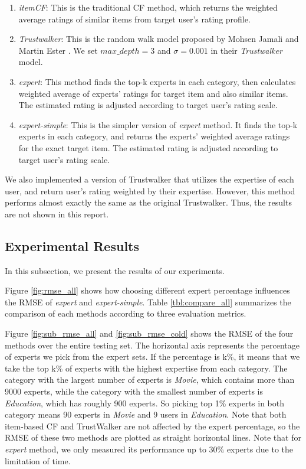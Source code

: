 \documentclass[12pt]{article}
\begin{document}
\begin{enumerate}
	\item \emph{itemCF}: This is the traditional CF method, which returns the weighted average ratings of similar items from target user's rating profile. 
	\item \emph{Trustwalker}: This is the random walk model proposed by Mohsen Jamali and Martin Ester \cite{Jamali:2009p67}. We set $max\_depth=3$ and $\sigma=0.001$ in their \emph{Trustwalker} model.
	\item \emph{expert}: This method finds the top-k experts in each category, then calculates weighted average of experts' ratings for target item and also similar items. The estimated rating is adjusted according to target user's rating scale. 
	\item \emph{expert-simple}: This is the simpler version of \emph{expert} method. It finds the top-k experts in each category, and returns the experts' weighted average ratings for the exact target item. The estimated rating is adjusted according to target user's rating scale. 
\end{enumerate}

We also implemented a version of Trustwalker that utilizes the expertise of each user, and return user's rating weighted by their expertise. However, this method performs almost exactly the same as the original Trustwalker. Thus, the results are not shown in this report. 


\subsection{Experimental Results}

In this subsection, we present the results of our experiments.

Figure \ref{fig:rmse_all} shows how choosing different expert percentage influences the RMSE of \emph{expert} and \emph{expert-simple}. Table \ref{tbl:compare_all} summarizes the comparison of each methods according to three evaluation metrics.

Figure \ref{fig:sub_rmse_all} and \ref{fig:sub_rmse_cold} shows the RMSE of the four methods over the entire testing set. The horizontal axis represents the percentage of experts we pick from the expert sets. If the percentage is k\%, it means that we take the top k\% of experts with the highest expertise from each category. The category with the largest number of experts is \emph{Movie}, which contains more than 9000 experts, while the category with the smallest number of experts is \emph{Education}, which has roughly 900 experts. So picking top 1\% experts in both category means 90 experts in \emph{Movie} and 9 users in \emph{Education}. Note that both item-based CF and TrustWalker are not affected by the expert percentage, so the RMSE of these two methods are plotted as straight horizontal lines. Note that for \emph{expert} method, we only measured its performance up to 30\% experts due to the limitation of time.
\end{document}
